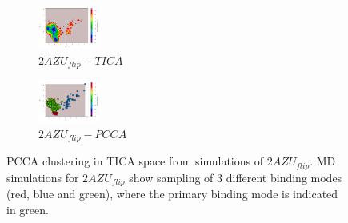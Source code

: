 \begin{figure}[!ht]
\centering
\begin{subfigure}{.5\textwidth}
  \centering
  \includegraphics[width=.9\linewidth]{chapter4/2AZU_flip/2AZU_flip-tica.pdf}
  \caption{$2AZU_{flip}-TICA$}
  \label{sup:2AZU_flip-tica}
\end{subfigure}%
\begin{subfigure}{.5\textwidth}
  \centering
  \includegraphics[width=.9\linewidth]{chapter4/2AZU_flip/2AZU_flip-pcca.pdf}
  \caption{$2AZU_{flip}-PCCA$}
  \label{sup:2AZU_flip-pcca}
\end{subfigure}
\caption[PCCA Clustering of $2AZU_{flip}$]{PCCA clustering in TICA space from simulations of $2AZU_{flip}$. MD simulations for $2AZU_{flip}$ show sampling of 3 different binding modes (red, blue and green), where the primary binding mode is indicated in green.}
\label{sup:2AZU_flip-cluster}
\end{figure}